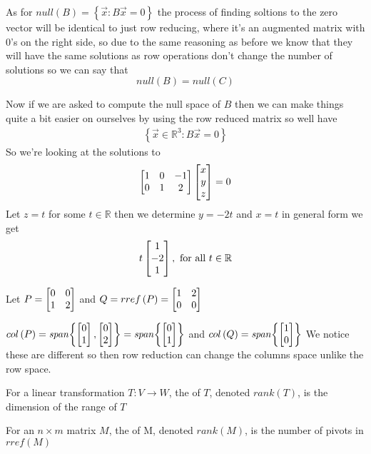 \documentclass[11pt]{book}
\begin{document}
\begin{eg}
    As for $\mathit{null} {\left( B \right)} = \left\{ \vec{x}: B \vec{x} = 0 \right\} $ the process of finding soltions to the zero vector will be identical to just row reducing, where it's an augmented matrix with 0's on the right side, so due to the same reasoning as before we know that they will have the same solutions as row operations don't change the number of solutions so we can say that 
    \begin{equation*}
        \mathit{null} {\left( B \right)}  = \mathit{null} {\left( C \right)} 
    \end{equation*}
\end{eg}

\begin{eg}
    Now if we are asked to compute the null space of $B$ then we can make things quite a bit easier on ourselves by using the row reduced matrix so well have
    \begin{gather*}
        \left\{ \vec{x} \in \mathbb{R}^3: B\vec{x} = 0 \right\}
    \end{gather*}
    So we're looking at the solutions to 
    \[
    \begin{bmatrix} 1 & 0 & -1 \\ 0 & 1 & 2 \end{bmatrix} \begin{bmatrix} x \\ y \\ z \end{bmatrix} = 0 
    \]
    Let $z = t$ for some $t \in \mathbb{R}$ then we determine $y = -2t$ and $x = t$ in general form we get
    \[
    t \begin{bmatrix} 1 \\ -2 \\ 1 \end{bmatrix}, \text{ for all  } t \in \mathbb{R}
    \]
\end{eg}

Let $P = \begin{bmatrix} 0 & 0 \\ 1 & 2 \end{bmatrix}$ and $Q = rref\left(P\right) = \begin{bmatrix} 1 & 2 \\ 0 & 0 \end{bmatrix}$

\begin{eg}
    $col\left(P\right) = \mathit{span} {\left\{ \begin{bmatrix} 0 \\ 1 \end{bmatrix}, \begin{bmatrix} 0 \\ 2 \end{bmatrix} \right\}} = \mathit{span} {\left\{ \begin{bmatrix} 0 \\ 1 \end{bmatrix} \right\}}$ and 
    $col\left(Q\right) = \mathit{span} {\left\{ \begin{bmatrix} 1 \\ 0 \end{bmatrix} \right\}} $ We notice these are different so then row reduction can change the columns space unlike the row space.
\end{eg}

\begin{defn}[Rank]\label{defn:rank}
    For a linear transformation $T : V \to W $,  the  of $T$,  denoted $rank\left(T\right)$, is the dimension of the range of $T$ 

    For an $n \times m$ matrix $M$,  the  of M, denoted $rank\left(M\right)$,  is the number of pivots in $rref\left(M\right)$ 
\end{defn}
\end{document}
